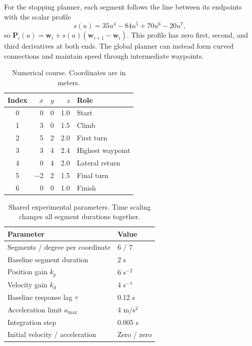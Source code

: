 \documentclass[letterpaper,10pt,conference]{ieeeconf}
\begin{document}
For the stopping planner, each segment follows the line between its endpoints with the scalar profile
\begin{equation}
s(u)=35u^4-84u^5+70u^6-20u^7,
\end{equation}
so $\bm P_i(u)=\bm w_i+s(u)(\bm w_{i+1}-\bm w_i)$.
This profile has zero first, second, and third derivatives at both ends.
The global planner can instead form curved connections and maintain speed through intermediate waypoints.
\begin{table}[t]\centering\small
\caption{Numerical course. Coordinates are in meters.}
\label{tab:waypoints}
\begin{tabular}{crrrl}\toprule
Index&$x$&$y$&$z$&Role\\\midrule
0&0&0&1.0&Start\\1&3&0&1.5&Climb\\2&5&2&2.0&First turn\\3&3&4&2.4&Highest waypoint\\4&0&4&2.0&Lateral return\\5&$-2$&2&1.5&Final turn\\6&0&0&1.0&Finish\\\bottomrule
\end{tabular}
\end{table}
\begin{table}[t]\centering\small
\caption{Shared experimental parameters. Time scaling changes all segment durations together.}
\label{tab:parameters}
\renewcommand{\arraystretch}{0.95}
\begin{tabularx}{\columnwidth}{Yl}\toprule
Parameter&Value\\\midrule
Segments / degree per coordinate&6 / 7\\
Baseline segment duration&2 s\\
Position gain $k_p$&6 s$^{-2}$\\
Velocity gain $k_d$&4 s$^{-1}$\\
Baseline response lag $\tau$&0.12 s\\
Acceleration limit $a_{\max}$&4 m/s$^2$\\
Integration step&0.005 s\\
Initial velocity / acceleration&Zero / zero\\
\bottomrule
\end{tabularx}\end{table}
\end{document}
